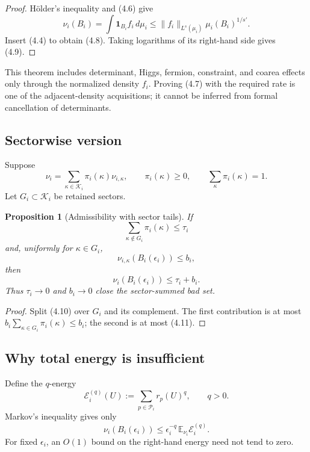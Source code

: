 \documentclass[11pt]{article}
\newtheorem{proposition}[theorem]{Proposition}
\begin{document}
\begin{proof}
H\"older's inequality and (4.6) give
\[
 \nu_i(B_i)=\int\mathbf1_{B_i}f_i\,d\mu_i
 \leq
 \|f_i\|_{L^s(\mu_i)}
 \mu_i(B_i)^{1/s'}.
\]
Insert (4.4) to obtain (4.8).  Taking logarithms of its right-hand side
gives (4.9).
\end{proof}

This theorem includes determinant, Higgs, fermion, constraint, and coarea
effects only through the normalized density \(f_i\).  Proving (4.7) with
the required rate is one of the adjacent-density acquisitions; it cannot
be inferred from formal cancellation of determinants.

\subsection{Sectorwise version}

Suppose
\[
 \nu_i=\sum_{\kappa\in\mathcal K_i}\pi_i(\kappa)\nu_{i,\kappa},
 \qquad \pi_i(\kappa)\geq0,\qquad\sum_\kappa\pi_i(\kappa)=1.
 \tag{4.10}
\]
Let \(G_i\subset\mathcal K_i\) be retained sectors.

\begin{proposition}[Admissibility with sector tails]
\label{prop:v11v4-sectors}
If
\[
 \sum_{\kappa\notin G_i}\pi_i(\kappa)\leq\tau_i
 \tag{4.11}
\]
and, uniformly for \(\kappa\in G_i\),
\[
 \nu_{i,\kappa}(B_i(\epsilon_i))\leq b_i,
 \tag{4.12}
\]
then
\[
 \nu_i(B_i(\epsilon_i))\leq\tau_i+b_i.
 \tag{4.13}
\]
Thus \(\tau_i\to0\) and \(b_i\to0\) close the sector-summed bad set.
\end{proposition}

\begin{proof}
Split (4.10) over \(G_i\) and its complement.  The first contribution is
at most \(b_i\sum_{\kappa\in G_i}\pi_i(\kappa)\leq b_i\); the second is at
most (4.11).
\end{proof}

\subsection{Why total energy is insufficient}

Define the \(q\)-energy
\[
 \mathcal E_i^{(q)}(U):=\sum_{p\in\mathcal P_i}r_p(U)^q,
 \qquad q>0.
 \tag{4.14}
\]
Markov's inequality gives only
\[
 \nu_i(B_i(\epsilon_i))
 \leq
 \epsilon_i^{-q}\,
 \mathbb E_{\nu_i}\mathcal E_i^{(q)}.
 \tag{4.15}
\]
For fixed \(\epsilon_i\), an \(O(1)\) bound on the right-hand energy need
not tend to zero.
\end{document}
